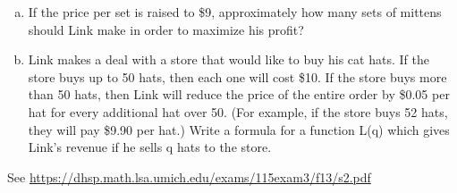 \documentclass[11pt]{exam}
\begin{document}
\begin{questions}
\begin{enumerate}[(a)]
	{\bf Warning}: we do not know how to answer the following question yet, but we will soon!
	\item If the price per set is raised to \$9, approximately how many sets of mittens should Link make in order to maximize his profit?
	\item Link makes a deal with a store that would like to buy his cat hats. If the store buys up to 50 hats, then each one will cost \$10. If the store buys more than 50 hats, then Link will reduce the price of the entire order by \$0.05 per hat for every additional hat over 50. (For example, if the store buys 52 hats, they will pay \$9.90 per hat.) Write a formula for a function L(q) which gives Link's revenue if he sells q hats to the store.
\end{enumerate}
\begin{solution}
  See \href{https://dhsp.math.lsa.umich.edu/exams/115exam3/f13/s2.pdf}{https://dhsp.math.lsa.umich.edu/exams/115exam3/f13/s2.pdf}
\end{solution}
\end{questions}
\end{document}
